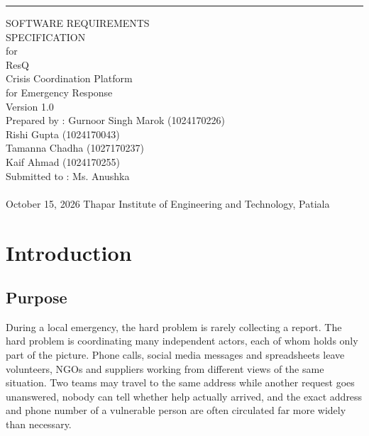 \documentclass{scrreprt}
\date{}
\def\myversion{1.0 }
\newcounter{fr}
\begin{document}
\begin{flushright}
    \rule{16cm}{5pt}\vskip0.6cm
    \begin{bfseries}
        \Huge{SOFTWARE REQUIREMENTS\\ SPECIFICATION}\\
        \vspace{0.9cm}
        for\\
        \vspace{0.9cm}
        ResQ\\
        \vspace{0.4cm}
        \Large{Crisis Coordination Platform\\ for Emergency Response}\\
        \vspace{0.9cm}
        \LARGE{Version \myversion}\\
        \large
        \vspace{0.9cm}
        Prepared by : Gurnoor Singh Marok (1024170226)\\
        Rishi Gupta (1024170043)\\
        Tamanna Chadha (1027170237)\\
        Kaif Ahmad (1024170255)\\
        \vspace{0.9cm}
        Submitted to : Ms. Anushka\\
        \vspace{0.9cm}
        \\\normalsize {October 15, 2026}
        \vspace{0.6cm}
        \normalsize{Thapar Institute of Engineering and Technology, Patiala}\\
    \end{bfseries}
\end{flushright}

\tableofcontents

\chapter{Introduction}

\section{Purpose}
During a local emergency, the hard problem is rarely collecting a report. The hard problem is coordinating many independent actors, each of whom holds only part of the picture. Phone calls, social media messages and spreadsheets leave volunteers, NGOs and suppliers working from different views of the same situation. Two teams may travel to the same address while another request goes unanswered, nobody can tell whether help actually arrived, and the exact address and phone number of a vulnerable person are often circulated far more widely than necessary.
\end{document}
